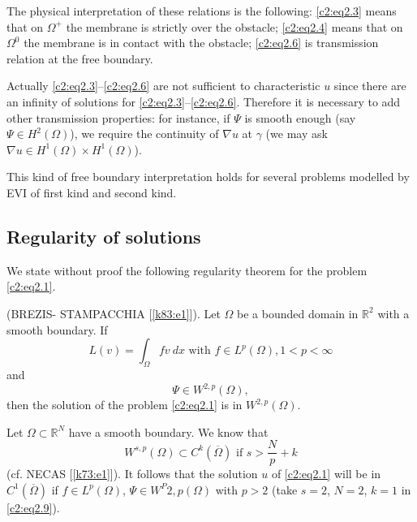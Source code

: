 The physical interpretation of these relations is the following:
\eqref{c2:eq2.3} 
means that on  $\Omega^+$  the membrane is strictly over the obstacle;
\eqref{c2:eq2.4} means that on $\Omega^0$ the membrane is in contact
with the obstacle; \eqref{c2:eq2.6} is transmission relation at the free
boundary.  

Actually \eqref{c2:eq2.3}--\eqref{c2:eq2.6} are not sufficient to
characteristic $u$ since 
there are an infinity of solutions for
\eqref{c2:eq2.3}--\eqref{c2:eq2.6}. Therefore it is 
necessary to add other transmission properties: for instance, if
$\Psi$ is smooth enough (say $\Psi \in H^2 (\Omega)$), we require
the  continuity of $\nabla u$ at $\gamma$ (we may ask
$\nabla u \in H^1(\Omega) \times H^1 (\Omega)$). 

\begin{remark}\label{c2:rem2.1}%
This kind of free boundary interpretation holds for several problems
modelled by EVI of first kind and second kind. 
\end{remark} 
 
\subsection{Regularity of solutions}\label{c2:ss2.4}%
 
We state without proof the following regularity theorem for the
problem \eqref{c2:eq2.1}. 
 
\begin{theorem}\label{c2:thm2.2_1}%
(BREZIS- STAMPACCHIA [\ref{k83:e1}]). Let $\Omega$ be a bounded domain in
  $\mathbb{R}^2$ with a smooth boundary. If  
\begin{equation}
L(v) = \int_\Omega fv~ dx \text{ with } f \in L^p (\Omega), 1 < p 
< \infty \tag{2.7}\label{c2:eq2.7}
\end{equation}
and 
\begin{equation}
\Psi \in W^{2, p} (\Omega), \tag{2.8}\label{c2:eq2.8}  
\end{equation} \pageoriginale  
then the solution of the problem \eqref{c2:eq2.1} is in $W^{2, p}(\Omega)$. 
\end{theorem} 
  
\begin{remark}\label{c2:rem2.2}%
Let $\Omega \subset \mathbb{R}^N$ have a smooth boundary. We know that 
\begin{equation}
W^{s, p} (\Omega) \subset C^k (\overline{\Omega}) \text{ if } s >
\frac{N}{p} + k\tag{2.9}\label{c2:eq2.9} 
\end{equation} 
(cf. NECAS [\ref{k73:e1}]). It follows that the solution $u$ of
\eqref{c2:eq2.1} will be in 
$C^1 (\overline{\Omega})$ if $f \in L^p (\Omega)$, $\Psi \in
W^P{2, p} (\Omega)$ with $p > 2$ (take $s=2$, $N=2$, $k=1$ in
\eqref{c2:eq2.9}).  
\end{remark} 
  

